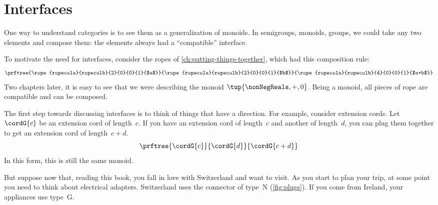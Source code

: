 

\section{Interfaces}\label{sec:interfaces}

One way to understand categories is to see them as a generalization of monoids.
In semigroups, monoids, groups, we could take any two elements and compose them: the elements always had a ``compatible'' interface.

To motivate the need for interfaces, consider the ropes of \cref{ch:putting-things-together}, which had this composition rule:
%
\begin{equation*}
    \prftree{\rope{ropecola}{ropecolb}{2}{0}{0}{1}{$a$}}
    {\rope{ropecola}{ropecolb}{2}{0}{0}{1}{$b$}}
    {\rope{ropecola}{ropecolb}{4}{0}{0}{1}{$a+b$}}
\end{equation*}
%
Two chapters later, it is easy to see that we were describing the monoid $\tup{\nonNegReals, +, 0}$.
Being a monoid, all pieces of rope are compatible and can be composed.

The first step towards discussing interfaces is to think of things that have a direction.
For example, consider extension cords.
Let~$\cordG{c}$ be an extension cord of length~$c$.
If you have an extension cord of length~$c$ and another of length~$d$, you can plug them together to get an extension cord of length~$c+d$.
%
\begin{equation}
    \label{eq:cords}
    \prftree{\cordG{c}}{\cordG{d}}{\cordG{c+d}}
\end{equation}
%
In this form, this is still the same monoid.

But suppose now that, reading this book, you fall in love with Switzerland and want to visit.
As you start to plan your trip, at some point you need to think about electrical adapters.
Switzerland uses the connector of type~N (\cref{fig:plugs}).
If you come from Ireland, your appliances use type~G.

